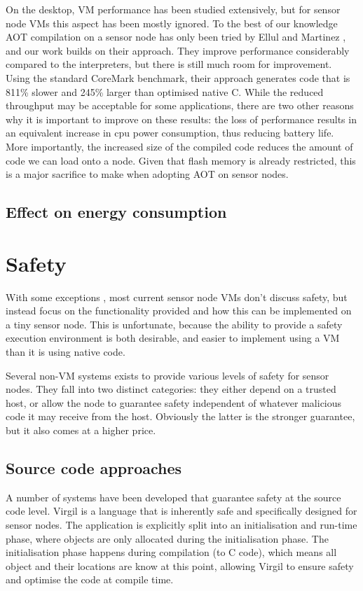 On the desktop, VM performance has been studied extensively, but for sensor node VMs this aspect has been mostly ignored. To the best of our knowledge AOT compilation on a sensor node has only been tried by Ellul and Martinez \cite{Ellul:2010iw}, and our work builds on their approach. They improve performance considerably compared to the interpreters, but there is still much room for improvement. Using the standard CoreMark benchmark, their approach generates code that is 811\% slower and 245\% larger than optimised native C. While the reduced throughput may be acceptable for some applications, there are two other reasons why it is important to improve on these results: the loss of performance results in an equivalent increase in cpu power consumption, thus reducing battery life. More importantly, the increased size of the compiled code reduces the amount of code we can load onto a node. Given that flash memory is already restricted, this is a major sacrifice to make when adopting AOT on sensor nodes.

\subsection{Effect on energy consumption}

\section{Safety}
\label{sec-state-of-the-art-safety}
With some exceptions \cite{Evers:2010ur}, most current sensor node VMs don't discuss safety, but instead focus on the functionality provided and how this can be implemented on a tiny sensor node. This is unfortunate, because the ability to provide a safety execution environment is both desirable, and easier to implement using a VM than it is using native code.

Several non-VM systems exists to provide various levels of safety for sensor nodes. They fall into two distinct categories: they either depend on a trusted host, or allow the node to guarantee safety independent of whatever malicious code it may receive from the host. Obviously the latter is the stronger guarantee, but it also comes at a higher price.

\subsection{Source code approaches}
A number of systems have been developed that guarantee safety at the source code level. Virgil \cite{Titzer:2006uy} is a language that is inherently safe and specifically designed for sensor nodes. The application is explicitly split into an initialisation and run-time phase, where objects are only allocated during the initialisation phase. The initialisation phase happens during compilation (to C code), which means all object and their locations are know at this point, allowing Virgil to ensure safety and optimise the code at compile time.

